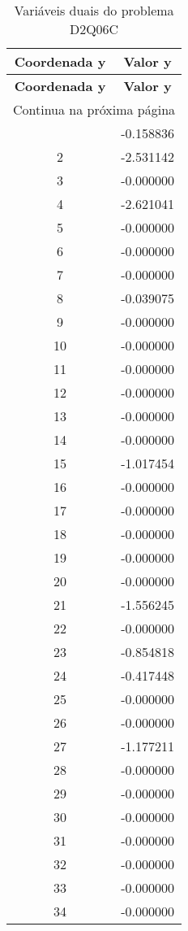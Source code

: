 \documentclass[12pt]{article}
\begin{document}
\begin{longtable}{@{}cc@{}}
\caption{Variáveis duais do problema D2Q06C} \\
\toprule
\textbf{Coordenada y} & \textbf{Valor y} \\
\midrule
\endfirsthead

\toprule
\textbf{Coordenada y} & \textbf{Valor y} \\
\midrule
\endhead

\midrule \multicolumn{2}{r}{{Continua na próxima página}} \\ \midrule
\endfoot

\bottomrule
\endlastfoot
1 & -0.158836 \\
2 & -2.531142 \\
3 & -0.000000 \\
4 & -2.621041 \\
5 & -0.000000 \\
6 & -0.000000 \\
7 & -0.000000 \\
8 & -0.039075 \\
9 & -0.000000 \\
10 & -0.000000 \\
11 & -0.000000 \\
12 & -0.000000 \\
13 & -0.000000 \\
14 & -0.000000 \\
15 & -1.017454 \\
16 & -0.000000 \\
17 & -0.000000 \\
18 & -0.000000 \\
19 & -0.000000 \\
20 & -0.000000 \\
21 & -1.556245 \\
22 & -0.000000 \\
23 & -0.854818 \\
24 & -0.417448 \\
25 & -0.000000 \\
26 & -0.000000 \\
27 & -1.177211 \\
28 & -0.000000 \\
29 & -0.000000 \\
30 & -0.000000 \\
31 & -0.000000 \\
32 & -0.000000 \\
33 & -0.000000 \\
34 & -0.000000 \\

\end{longtable}
\end{document}

